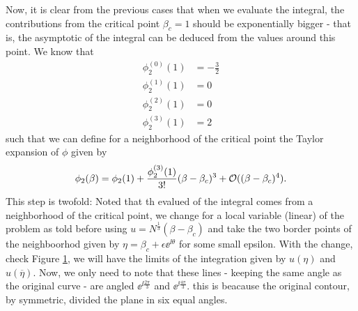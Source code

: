 Now, it is clear from the previous cases that when we evaluate the integral, the contributions from the critical point $\beta_c = 1$ should be exponentially bigger - that is, the asymptotic of the integral can be deduced from the values around this point. We know that 
\begin{align}
	\phi^{(0)}_{2}(1) & = - \frac{3}{2} \\
	\phi^{(1)}_{2}(1) & = 0\\
	\phi^{(2)}_{2}(1) & = 0\\
	\phi^{(3)}_{2}(1) & = 2
\end{align}
such that we can define for a neighborhood of the critical point the Taylor expansion of $\phi$ given by
\begin{equation}
	\phi_{2}(\beta) = \phi_{2}(1) + \frac{\phi^{(3)}_{2}(1)}{3!} (\beta - \beta_c)^3 + \mathcal{O}((\beta - \beta_c)^4).
\end{equation}
This step is twofold: Noted that th evalued of the integral comes from a neighborhood of the critical point, we change for a local variable (linear) of the problem as told before using $u = N^{\frac{1}{3}}(\beta - \beta_c)$ and take the two border points of the neighboorhod given by $\eta = \beta_c + \epsilon \ee^{\ii \theta}$ for some small epsilon. With the change, check Figure \ref{Figure: Change of local variables, Airy}, we will have the limits of the integration given by $u(\eta)$ and $u(\overline{\eta})$. Now, we only need to note that these lines - keeping the same angle as the original curve - are angled $\ee^{\ii \frac{2\pi}{3}}$ and $\ee^{\ii \frac{4\pi}{3}}$. this is beacause the original contour, by symmetric, divided the plane in six equal angles. 
\begin{figure}
	\centering
\label{Figure: Change of local variables, Airy}
\end{figure}
